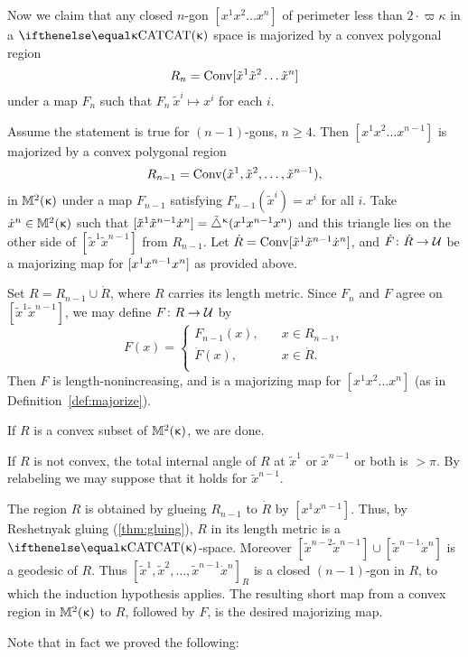 Now we claim that any closed $n$-gon $[x^1x^2 \dots x^n ]$ of perimeter less than $2\cdot \varpi\kappa$ in a $\CAT{\kappa}$ space  is majorized by a convex polygonal region \[R_n=\Conv[\tilde x^1\tilde x^2\dots\tilde x^n]\]
under a map $F_n$ such that $F_n\:\tilde x^i\mapsto x^i$ for each $i$. 


Assume the statement is true for $(n-1)$-gons, $n\ge 4$.  
Then  $[x^1 x^2 \dots x^{n-1}]$  is majorized by a convex polygonal region 
\[R_{n-1}=\Conv(\tilde x^1, \tilde x^2, \dots, \tilde x^{n-1}),\] 
in $\mathbb{M}_{{}}^{2}({\upkappa})$ under a map $F_{n-1}$ satisfying $F_{n-1}(\tilde x^i)=x^i$ for all $i$. 
Take $\dot x^n\in\Lob2{\kappa}$ such that $[{\tilde x^1}{\tilde x^{n-1}}{\dot x^n}]={\tilde\triangle}^{\upkappa}(x^1 x^{n-1} x^n)$ 
and this triangle lies on the other side of $[\tilde x^1\tilde x^{n-1}]$ from $R_{n-1}$.  
Let $\dot R\z=\Conv\trig{\tilde x^1}{\tilde x^{n-1}}{\dot x^n}$, 
and $\dot F\:\dot R\to \spc{U}$ be a majorizing map for $[{ x^1}{x^{n-1}}{ x^n}]$ as provided above.

Set 
$R= R_{n-1}\cup \dot R$, where $R$ carries its length metric.
Since $F_n$ and $F$ agree on $[\tilde x^1 \tilde x^{n-1}]$, we may define $F\:R\to\spc{U}$ by 
\[
F(x)=
\begin{cases}
F_{n-1}(x),\quad & x\in R_{n-1},\\
\dot F(x),\quad & x\in \dot R.\\
\end{cases}
\]
Then $F$ is length-nonincreasing, and is a majorizing map for $[x^1 x^2 \dots x^n ]$ (as in Definition~\ref{def:majorize}).

If $R$ is a convex subset of $\mathbb{M}_{{}}^{2}({\upkappa})$, we are done. 

If $R$ is not convex,  the total internal angle of $R$ at $\tilde x^1$ or $ \tilde x^{n-1} $ or both is $>\pi$.  
By relabeling we may suppose that it holds for $\tilde x^{n-1}$.  

The region $R$ is obtained by glueing $R_{n-1}$ to $\dot R$ by $[x^1x^{n-1}]$.
Thus, by Reshetnyak gluing (\ref{thm:gluing}), $R$ in its length metric is a $\CAT{\kappa}$-space.  
Moreover $[\tilde x^{n-2}\tilde x^{n-1}]\cup[\tilde x^{n-1} \dot x^n]$ is a geodesic of $R$.
Thus $[\tilde x^1, \tilde x^2, \dots, \tilde x^{n-1} \dot x^n]_R$ is a closed $(n-1)$-gon in $R$, to which the induction hypothesis applies. The resulting short map from a convex region in $ \mathbb{M}_{{}}^{2}({\upkappa})$ to $R$, followed by $F$,  is the desired majorizing map.

\medskip

Note that in fact we proved the following:

